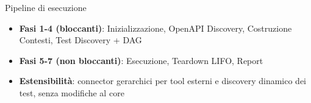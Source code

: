 
\begin{frame}{Pipeline di esecuzione}
  \begin{itemize}
    \item \textbf{Fasi 1-4 (bloccanti)}: Inizializzazione, OpenAPI Discovery, Costruzione Contesti, Test Discovery + DAG

    \item \textbf{Fasi 5-7 (non bloccanti)}: Esecuzione, Teardown LIFO, Report

    \item \textbf{Estensibilità}: connector gerarchici per tool esterni e discovery dinamico dei test, senza modifiche al core
  \end{itemize}
\end{frame}